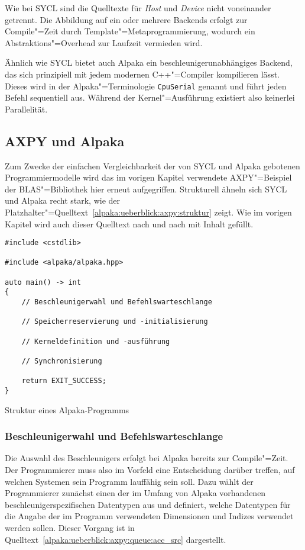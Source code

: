 Wie bei SYCL sind die Quelltexte für \textit{Host} und \textit{Device} nicht
voneinander getrennt. Die Abbildung auf ein oder mehrere Backends erfolgt zur
Compile"=Zeit durch Template"=Metaprogrammierung, wodurch ein
Abstraktions"=Overhead zur Laufzeit vermieden wird.

Ähnlich wie SYCL bietet auch Alpaka ein beschleunigerunabhängiges Backend, das
sich prinzipiell mit jedem modernen C++"=Compiler kompilieren lässt. Dieses
wird in der Alpaka"=Terminologie \texttt{CpuSerial} genannt und führt jeden
Befehl sequentiell aus. Während der Kernel"=Ausführung existiert also keinerlei
Parallelität.

\subsection{AXPY und Alpaka}\label{alpaka:ueberblick:axpy}

Zum Zwecke der einfachen Vergleichbarkeit der von SYCL und Alpaka gebotenen
Programmiermodelle wird das im vorigen Kapitel verwendete AXPY"=Beispiel der
BLAS"=Bibliothek hier erneut aufgegriffen. Strukturell ähneln sich SYCL und
Alpaka recht stark, wie der
Platzhalter"=Quelltext~\ref{alpaka:ueberblick:axpy:struktur} zeigt. Wie im
vorigen Kapitel wird auch dieser Quelltext nach und nach mit Inhalt gefüllt.

\begin{code}
    \begin{verbatim}
#include <cstdlib>

#include <alpaka/alpaka.hpp>

auto main() -> int
{
    // Beschleunigerwahl und Befehlswarteschlange

    // Speicherreservierung und -initialisierung

    // Kerneldefinition und -ausführung

    // Synchronisierung

    return EXIT_SUCCESS;
}
    \end{verbatim}
    \caption{Struktur eines Alpaka-Programms}
    \label{alpaka:ueberblick:axpy:struktur}
\end{code}

\subsubsection{Beschleunigerwahl und Befehlswarteschlange}
\label{alpaka:ueberblick:axpy:queue}

Die Auswahl des Beschleunigers erfolgt bei Alpaka bereits zur Compile"=Zeit. Der
Programmierer muss also im Vorfeld eine Entscheidung darüber treffen, auf
welchen Systemen sein Programm lauffähig sein soll. Dazu wählt der Programmierer
zunächst einen der im Umfang von Alpaka vorhandenen beschleunigerspezifischen
Datentypen aus und definiert, welche Datentypen für die Angabe der im Programm
verwendeten Dimensionen und Indizes verwendet werden sollen. Dieser Vorgang ist
in Quelltext~\ref{alpaka:ueberblick:axpy:queue:acc_src} dargestellt.


